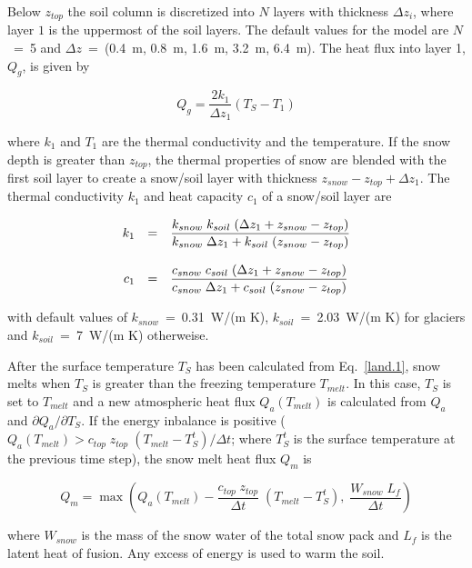 Below $z_{top}$ the soil column is discretized into
$N$ layers with thickness $\Delta z_i$,
where layer $1$ is the uppermost of the soil
layers. The default values for the model are $N$~=~5
and $\Delta z$~=~(0.4~m, 0.8~m, 1.6~m, 
3.2~m, 6.4~m). The heat flux into layer 1, $Q_g$, is
given by

\begin{equation}
Q_g=\frac{2 k_{1}}{\Delta z_{1}} (T_S - T_{1})
\end{equation}
 
where $k_{1}$ and $T_{1}$ are the thermal
conductivity and the temperature.
If the snow depth is greater than $z_{top}$, the
thermal properties of snow are blended with the
first soil layer to create a snow/soil layer with
thickness $z_{snow}-z_{top}+\Delta z_1$. The
thermal conductivity $k_1$ and heat capacity
$c_1$ of a snow/soil layer are

\begin{equation}
\begin{array}{rcl}
\displaystyle k_1 & = & \displaystyle \frac{k_{snow}\; k_{soil}\; (\Delta
z_1+z_{snow}-z_{top})}{k_{snow}\; \Delta z_1 +
k_{soil}\; (z_{snow}-z_{top})} \\
&&\\
\displaystyle c_1 & = & \displaystyle \frac{c_{snow}\; c_{soil}\; (\Delta
z_1+z_{snow}-z_{top})}{c_{snow}\; \Delta z_1 +
c_{soil}\; (z_{snow}-z_{top})}
\end{array}
\end{equation}

with default values of $k_{snow}$~=~0.31~W/(m K),
$k_{soil}$~=~2.03~W/(m K) for
glaciers and   $k_{soil}$~=~7~W/(m K) otherweise.
 
After the surface temperature $T_S$ has been
calculated
from Eq.~\ref{land.1}, snow melts when $T_S$ is
greater than the freezing temperature $T_{melt}$. In this
case,  $T_S$ is set to $T_{melt}$ and a new atmospheric
heat
flux $Q_a(T_{melt})$ is calculated from  $Q_a$ and
$\partial Q_a/\partial T_S$. If  the energy inbalance is
positive ($Q_a(T_{melt}) >  c_{top} \; z_{top}\;  (T_{melt} -
T_S^{t})/\Delta t$; where $T_S^{t}$ is the surface
temperature at
the previous time step),  the  
snow melt heat flux $Q_m$ is

\begin{equation}\label{melt}
Q_m=\max(Q_a(T_{melt}) - \frac{c_{top} \; z_{top}}{\Delta
t} \; (T_{melt} - T_S^{t}), \; \frac{W_{snow} \; L_f}{\Delta t})
\end{equation}

where $W_{snow}$ is the mass of the snow water of
the
total snow pack and $L_f$ is the latent heat of fusion. 
Any excess of energy is used to warm the soil.


